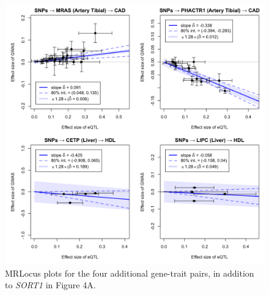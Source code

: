 \documentclass[11pt]{article}
\begin{document}
\begin{figure}[!ht]
  \centering
  \includegraphics[width=\textwidth]{figs/realloci.png}
  \caption{MRLocus plots for the four additional gene-trait pairs, in
    addition to \emph{SORT1} in Figure 4A.}
\end{figure}
\end{document}
